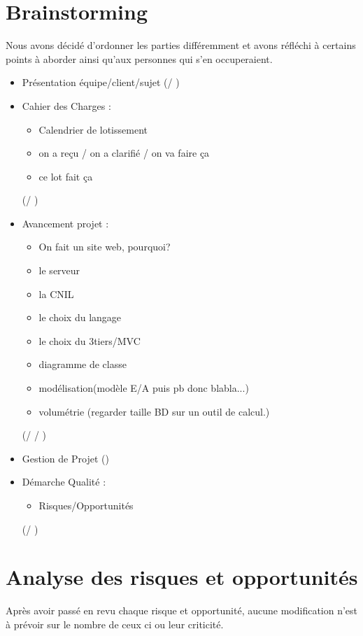 \documentclass [a4paper] {article}
\begin{document}
\section{Brainstorming}
Nous avons décidé d'ordonner les parties différemment et avons réfléchi à certains points à aborder ainsi qu'aux personnes qui s'en occuperaient.
\begin{itemize}
\item Présentation équipe/client/sujet (\Melissa / \Sergi)
\item Cahier des Charges : 
\begin{itemize} 
\item Calendrier de lotissement 
\item on a reçu / on a clarifié / on va faire ça 
\item ce lot fait ça 
\end{itemize} (\Mathieu / \Michel)
\item Avancement projet : 
\begin{itemize} 
\item On fait un site web, pourquoi? 
\item le serveur 
\item la CNIL 
\item le choix du langage 
\item le choix du 3tiers/MVC 
\item diagramme de classe 
\item modélisation(modèle E/A puis pb donc blabla...) 
\item volumétrie (regarder taille BD sur un outil de calcul.) 
\end{itemize} (\Florian / \Matthieu / \Julie)
\item Gestion de Projet (\Sergi)
\item Démarche Qualité : 
\begin{itemize} 
\item Risques/Opportunités 
\end{itemize} (\Pierre / \Kafui)


\end{itemize}

\section{Analyse des risques et opportunités}
Après avoir passé en revu chaque risque et opportunité, aucune modification n'est à prévoir sur le nombre de ceux ci ou leur criticité.


\end{document}
